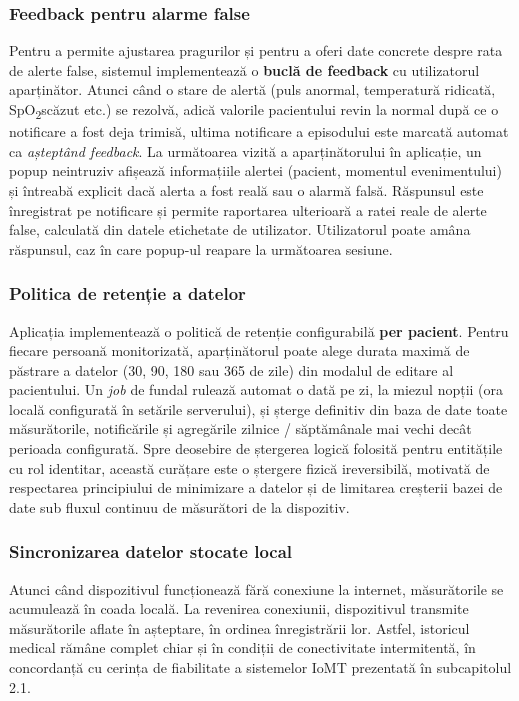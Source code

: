 \documentclass[12pt,a4paper]{article}
\newcommand{\spo}{SpO\textsubscript{2}}
\begin{document}
\subsubsection{Feedback pentru alarme false}

Pentru a permite ajustarea pragurilor și pentru a oferi date concrete despre rata de alerte false, sistemul implementează o \textbf{buclă de feedback} cu utilizatorul aparținător. Atunci când o stare de alertă (puls anormal, temperatură ridicată, \spo scăzut etc.) se rezolvă, adică valorile pacientului revin la normal după ce o notificare a fost deja trimisă, ultima notificare a episodului este marcată automat ca \textit{așteptând feedback}. La următoarea vizită a aparținătorului în aplicație, un popup neintruziv afișează informațiile alertei (pacient, momentul evenimentului) și întreabă explicit dacă alerta a fost reală sau o alarmă falsă. Răspunsul este înregistrat pe notificare și permite raportarea ulterioară a ratei reale de alerte false, calculată din datele etichetate de utilizator. Utilizatorul poate amâna răspunsul, caz în care popup-ul reapare la următoarea sesiune.

\subsubsection{Politica de retenție a datelor}

Aplicația implementează o politică de retenție configurabilă \textbf{per pacient}. Pentru fiecare persoană monitorizată, aparținătorul poate alege durata maximă de păstrare a datelor (30, 90, 180 sau 365 de zile) din modalul de editare al pacientului. Un \textit{job} de fundal rulează automat o dată pe zi, la miezul nopții (ora locală configurată în setările serverului), și șterge definitiv din baza de date toate măsurătorile, notificările și agregările zilnice / săptămânale mai vechi decât perioada configurată. Spre deosebire de ștergerea logică folosită pentru entitățile cu rol identitar, această curățare este o ștergere fizică ireversibilă, motivată de respectarea principiului de minimizare a datelor și de limitarea creșterii bazei de date sub fluxul continuu de măsurători de la dispozitiv.

\subsubsection{Sincronizarea datelor stocate local}

Atunci când dispozitivul funcționează fără conexiune la internet, măsurătorile se acumulează în coada locală. La revenirea conexiunii, dispozitivul transmite măsurătorile aflate în așteptare, în ordinea înregistrării lor. Astfel, istoricul medical rămâne complet chiar și în condiții de conectivitate intermitentă, în concordanță cu cerința de fiabilitate a sistemelor IoMT prezentată în subcapitolul 2.1.
\end{document}
